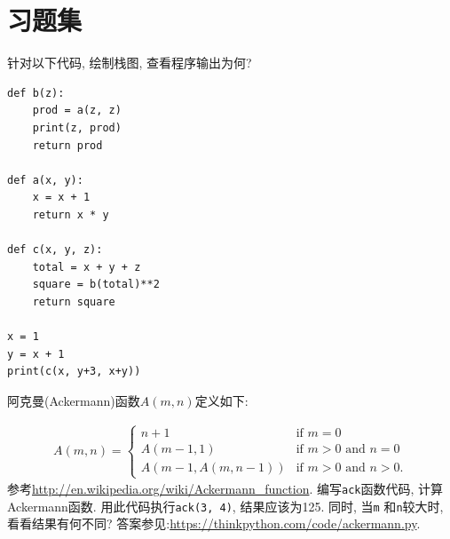 \documentclass[10pt]{book}
\begin{document}
\section{习题集}

\begin{exercise}
针对以下代码, 绘制栈图, 查看程序输出为何?

\begin{verbatim}
def b(z):
    prod = a(z, z)
    print(z, prod)
    return prod

def a(x, y):
    x = x + 1
    return x * y

def c(x, y, z):
    total = x + y + z
    square = b(total)**2
    return square

x = 1
y = x + 1
print(c(x, y+3, x+y))
\end{verbatim}

\end{exercise}


\begin{exercise}
\label{ackermann}

阿克曼(Ackermann)函数$A(m, n)$定义如下:

\begin{eqnarray*}
A(m, n) = \begin{cases} 
              n+1 & \mbox{if } m = 0 \\ 
        A(m-1, 1) & \mbox{if } m > 0 \mbox{ and } n = 0 \\ 
A(m-1, A(m, n-1)) & \mbox{if } m > 0 \mbox{ and } n > 0.
\end{cases} 
\end{eqnarray*}
%
参考\url{http://en.wikipedia.org/wiki/Ackermann_function}.
编写{\tt ack}函数代码, 计算Ackermann函数. 
用此代码执行{\tt ack(3, 4)}, 结果应该为125. 
同时, 当{\tt m} 和{\tt n}较大时, 看看结果有何不同? 
答案参见:\url{https://thinkpython.com/code/ackermann.py}.

\end{exercise}
\end{document}
